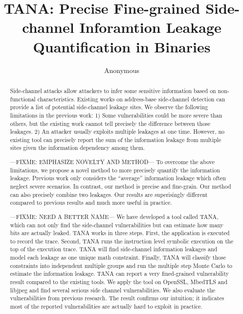 \documentclass[conference]{IEEEtran}
\newcommand{\tool}{TANA}
\begin{document}
\title{\tool{}: Precise Fine-grained Side-channel Inforamtion Leakage Quantification in Binaries}
\author{Anonymous}

\maketitle

\begin{abstract}
Side-channel attacks allow attackers to infer some sensitive information based on 
non-functional characteristics. Existing works on address-base side-channel detection 
can provide a list of potential side-channel leakage sites. We observe 
 the following limitations in the previous work: 1) 
Some vulnerabilities could be more severe than others, but the existing work 
cannot tell precisely the difference between those leakages. 2)  An attacker usually exploits multiple 
leakages at one time. However, no existing tool can precisely report
the sum of the information leakage from multiple sites given the information dependency among them.

---FIXME: EMPHASIZE NOVELTY AND METHOD---
To overcome the above limitations, we propose a novel method
to more precisely quantify the information leakage. Previous work only considers the
``average'' information leakage which often neglect severe scenarios.
In contrast, our method is precise and fine-grain. 
Our method can also precisely combine two leakages. 
Our results are superisingly different compared to previous results
and much more useful in practice.

---FIXME: NEED A BETTER NAME---
We have developed a tool called \tool{}, which can not only 
find the side-channel vulnerabilities but can estimate how many bits are actually leaked. 
 \tool{} works in three steps. First, the application is executed to record the 
trace. Second, \tool{} runs the instruction level symbolic execution on the top of the 
execution trace. \tool{} will find side-channel information leakages and model each leakage 
as one unique math constraint. Finally, \tool{} will classify those constraints into 
independent multiple groups and run the multiple step Monte Carlo to estimate the 
information leakage. \tool{} can report a very fined-grained vulnerability result 
compared to the existing tools.
We apply the tool on OpenSSL, MbedTLS and libjpeg and find several serious side channel 
vulnerabilities. We also evaluate the vulnerabilities from previous research. The result 
confirms our intuition; it 
indicates most of the reported vulnerabilities are actually hard to exploit in practice.

\end{abstract}
\end{document}
